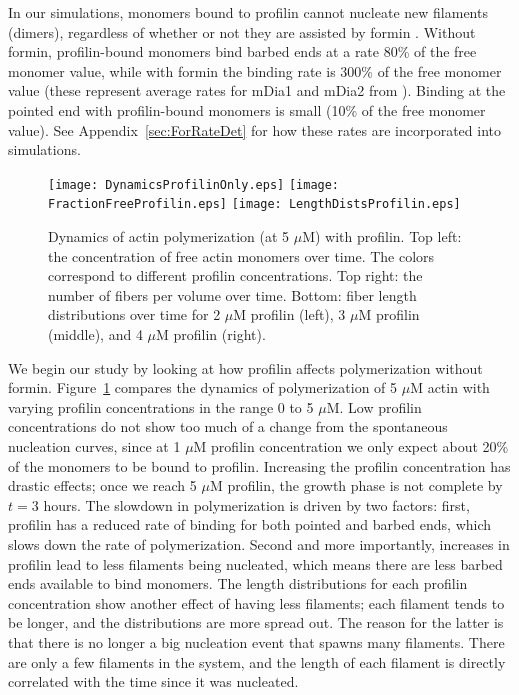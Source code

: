 \documentclass[11pt]{article}
\begin{document}
In our simulations, monomers bound to profilin cannot nucleate new filaments (dimers), regardless of whether or not they are assisted by formin \cite{paul2009review}. Without formin, profilin-bound monomers bind barbed ends at a rate 80\% of the free monomer value, while with formin the binding rate is 300\% of the free monomer value (these represent average rates for mDia1 and mDia2 from \cite{kovar2006control}). Binding at the pointed end with profilin-bound monomers is small (10\% of the free monomer value). See Appendix\ \ref{sec:ForRateDet} for how these rates are incorporated into simulations. 

\begin{figure}
\centering
\texttt{[image: DynamicsProfilinOnly.eps]}
\texttt{[image: FractionFreeProfilin.eps]}
\texttt{[image: LengthDistsProfilin.eps]}
\caption{\label{fig:ActinProfilin}Dynamics of actin polymerization (at 5 $\mu$M) with profilin. Top left: the concentration of free actin monomers over time. The colors correspond to different profilin concentrations. Top right: the number of fibers per volume over time. Bottom: fiber length distributions over time for 2 $\mu$M profilin (left), 3 $\mu$M profilin (middle), and 4 $\mu$M profilin (right).}
\end{figure}

We begin our study by looking at how profilin affects polymerization without formin. Figure\ \ref{fig:ActinProfilin} compares the dynamics of polymerization of 5 $\mu$M actin with varying profilin concentrations in the range 0 to 5 $\mu$M. Low profilin concentrations do not show too much of a change from the spontaneous nucleation curves, since at 1 $\mu$M profilin concentration we only expect about 20\% of the monomers to be bound to profilin. Increasing the profilin concentration has drastic effects; once we reach 5 $\mu$M profilin, the growth phase is not complete by $t=3$ hours. The slowdown in polymerization is driven by two factors: first, profilin has a reduced rate of binding for both pointed and barbed ends, which slows down the rate of polymerization. Second and more importantly, increases in profilin lead to less filaments being nucleated, which means there are less barbed ends available to bind monomers. The length distributions for each profilin concentration show another effect of having less filaments; each filament tends to be longer, and the distributions are more spread out. The reason for the latter is that there is no longer a big nucleation event that spawns many filaments. There are only a few filaments in the system, and the length of each filament is directly correlated with the time since it was nucleated.
\end{document}
